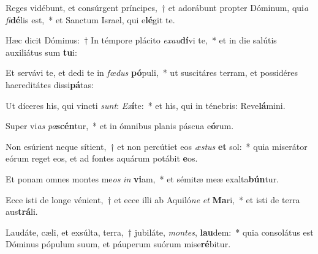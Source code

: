 \item Reges vidébunt, et consúrgent príncipes,~† et adorábunt propter Dóminum, qui\textit{a} \textit{fi}\textbf{dé}lis est,~* et Sanctum Israel, qui e\textbf{lé}git te.
\item Hæc dicit Dóminus:~† In témpore plácito \textit{ex}\textit{au}\textbf{dí}vi te,~* et in die salútis auxiliátus sum \textbf{tu}i:
\item Et servávi te, et dedi te in \textit{fœ}\textit{dus} \textbf{pó}puli,~* ut suscitáres terram, et possidéres haereditátes dissi\textbf{pá}tas:
\item Ut díceres his, qui vincti \textit{sunt}: \textit{Ex}\textbf{í}te:~* et his, qui in ténebris: Reve\textbf{lá}mini.
\item Super vi\textit{as} \textit{pa}\textbf{scén}tur,~* et in ómnibus planis páscua e\textbf{ó}rum.
\item Non esúrient neque sítient,~† et non percútiet eos \textit{æs}\textit{tus} \textbf{et} sol:~* quia miserátor eórum reget eos, et ad fontes aquárum potábit \textbf{e}os.
\item Et ponam omnes montes me\textit{os} \textit{in} \textbf{vi}am,~* et sémitæ meæ exalta\textbf{bún}tur.
\item Ecce isti de longe vénient,~† et ecce illi ab Aquiló\textit{ne} \textit{et} \textbf{Ma}ri,~* et isti de terra aus\textbf{trá}li.
\item Laudáte, cæli, et exsúlta, terra,~† jubiláte, \textit{mon}\textit{tes}, \textbf{lau}dem:~* quia consolátus est Dóminus pópulum suum, et páuperum suórum mise\textbf{ré}bitur.
